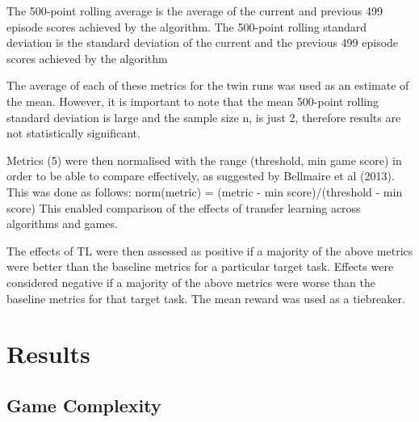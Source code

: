 The 500-point rolling average is the average of the current and previous 499 episode scores achieved by the algorithm. The 500-point rolling standard deviation is the standard deviation of the current and the previous 499 episode scores achieved by the algorithm

The average of each of these metrics for the twin runs was used as an estimate of the mean. However, it is important to note that the mean 500-point rolling standard deviation is large and the sample size n, is just 2, therefore results are not statistically significant. 

Metrics (5) were then normalised with the range (threshold, min game score) in order to be able to compare effectively, as suggested by Bellmaire et al (2013). This was done as follows: norm(metric) = (metric - min score)/(threshold - min score) 
This enabled comparison of the effects of transfer learning across algorithms and games.

The effects of TL were then assessed as positive if a majority of the above metrics were better than the baseline metrics for a particular target task. Effects were considered negative if a majority of the above metrics were worse than the baseline metrics for that target task. The mean reward was used as a tiebreaker.


\section{Results}

\subsection*{Game Complexity}

